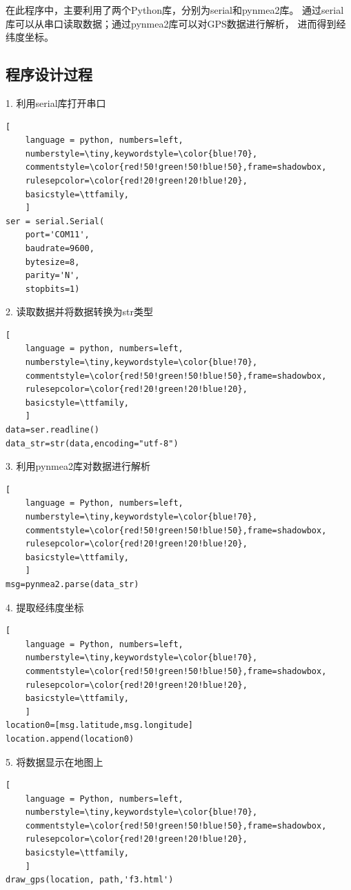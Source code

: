 \documentclass[UTF-8, a4paper, 12pt]{ctexart}
\begin{document}
在此程序中，主要利用了两个Python库，分别为serial和pynmea2库。
通过serial库可以从串口读取数据；通过pynmea2库可以对GPS数据进行解析，
进而得到经纬度坐标。
\subsection{程序设计过程}
1. 利用serial库打开串口
\begin{lstlisting}[
	language = python, numbers=left, 
	numberstyle=\tiny,keywordstyle=\color{blue!70},
	commentstyle=\color{red!50!green!50!blue!50},frame=shadowbox,
	rulesepcolor=\color{red!20!green!20!blue!20},
	basicstyle=\ttfamily,
	]
ser = serial.Serial(
    port='COM11',
    baudrate=9600, 
    bytesize=8, 
    parity='N', 
    stopbits=1) 
\end{lstlisting}

2. 读取数据并将数据转换为str类型
\begin{lstlisting}[
	language = python, numbers=left, 
	numberstyle=\tiny,keywordstyle=\color{blue!70},
	commentstyle=\color{red!50!green!50!blue!50},frame=shadowbox,
	rulesepcolor=\color{red!20!green!20!blue!20},
	basicstyle=\ttfamily,
	]
data=ser.readline()
data_str=str(data,encoding="utf-8")
\end{lstlisting}

3. 利用pynmea2库对数据进行解析
\begin{lstlisting}[
	language = Python, numbers=left, 
	numberstyle=\tiny,keywordstyle=\color{blue!70},
	commentstyle=\color{red!50!green!50!blue!50},frame=shadowbox,
	rulesepcolor=\color{red!20!green!20!blue!20},
	basicstyle=\ttfamily,
	]
msg=pynmea2.parse(data_str)
\end{lstlisting}

4. 提取经纬度坐标
\begin{lstlisting}[
	language = Python, numbers=left, 
	numberstyle=\tiny,keywordstyle=\color{blue!70},
	commentstyle=\color{red!50!green!50!blue!50},frame=shadowbox,
	rulesepcolor=\color{red!20!green!20!blue!20},
	basicstyle=\ttfamily,
    ]
location0=[msg.latitude,msg.longitude]
location.append(location0)
\end{lstlisting}

5. 将数据显示在地图上
\begin{lstlisting}[
	language = Python, numbers=left, 
	numberstyle=\tiny,keywordstyle=\color{blue!70},
	commentstyle=\color{red!50!green!50!blue!50},frame=shadowbox,
	rulesepcolor=\color{red!20!green!20!blue!20},
	basicstyle=\ttfamily,
    ]
draw_gps(location, path,'f3.html')
\end{lstlisting}
\end{document}
